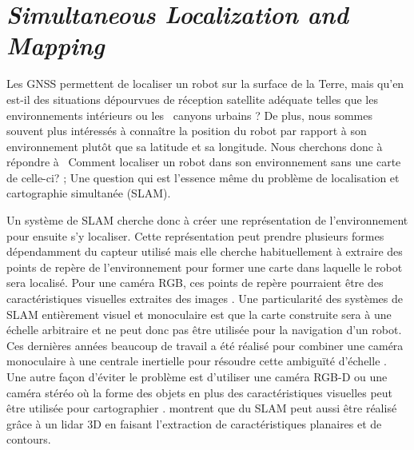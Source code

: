 \section{\textit{Simultaneous Localization and Mapping}}\label{subsec:reconstruction}

Les GNSS permettent de localiser un robot sur la surface de la Terre, mais qu'en est-il des situations dépourvues de réception satellite adéquate telles que les environnements intérieurs ou les \guillemotleft \ canyons urbains \guillemotright ? De plus, nous sommes souvent plus intéressés à connaître la position du robot par rapport à son environnement plutôt que sa latitude et sa longitude. Nous cherchons donc à répondre à \guillemotleft \ Comment localiser un robot dans son environnement sans une carte de celle-ci? \guillemotright; Une question qui est l'essence même du problème de localisation et cartographie simultanée (SLAM).

Un système de SLAM cherche donc à créer une représentation de l'environnement pour ensuite s'y localiser. Cette représentation peut prendre plusieurs formes dépendamment du capteur utilisé mais elle cherche habituellement à extraire des points de repère de l'environnement pour former une carte dans laquelle le robot sera localisé. Pour une caméra RGB, ces points de repère pourraient être des caractéristiques visuelles extraites des images \citep{Mur-Artal2017}. Une particularité des systèmes de SLAM entièrement visuel et monoculaire est que la carte construite sera à une échelle arbitraire et ne peut donc pas être utilisée pour la navigation d'un robot. Ces dernières années beaucoup de travail a été réalisé pour combiner une caméra monoculaire à une centrale inertielle pour résoudre cette ambiguïté d'échelle \citep{muratal2017vimonoslam}. Une autre façon d'éviter le problème est d'utiliser une caméra RGB-D ou une caméra stéréo où la forme des objets en plus des caractéristiques visuelles peut être utilisée pour cartographier \citep{henry2014rgb}. \cite{Zhang2017} montrent que du SLAM peut aussi être réalisé grâce à un lidar 3D en faisant l'extraction de caractéristiques planaires et de contours.

